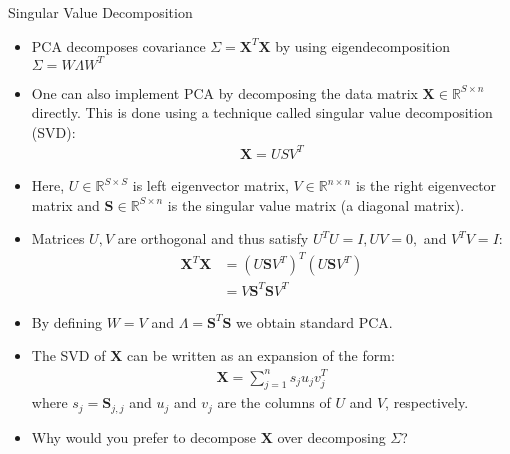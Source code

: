 \documentclass[9pt]{beamer}
\begin{document}
\begin{frame}{Singular Value Decomposition}

\begin{itemize}
\item PCA decomposes covariance $\Sigma=\mathbf{X}^T\mathbf{X}$ by using  eigendecomposition $\Sigma=W\Lambda W^T$

\item One can also implement PCA by decomposing the data matrix $\mathbf{X}\in\mathbb{R}^{S\times n}$ directly. This is done using a technique called singular value decomposition (SVD):
\begin{align*}
\mathbf{X}=USV^T
\end{align*}
\item Here, $U\in \mathbb{R}^{S\times S}$ is left eigenvector matrix, $V\in \mathbb{R}^{n\times n}$ is the right eigenvector matrix and $\mathbf{S}\in \mathbb{R}^{S\times n}$ is the singular value matrix (a diagonal matrix). 
\item Matrices $U,V$ are orthogonal and thus satisfy $U^TU=I,UV=0,$ and $V^TV=I$:
\begin{align*}
\mathbf{X}^T\mathbf{X}&=(U\mathbf{S}V^T)^T(U\mathbf{S}V^T)\\
&=V\mathbf{S}^T\mathbf{S}V^T
\end{align*}
\item By defining $W=V$ and $\Lambda=\mathbf{S}^T\mathbf{S}$ we obtain standard PCA. 
\item The SVD of $\mathbf{X}$ can be written as an expansion of the form:
\begin{align*}
\mathbf{X}=\sum_{j=1}^ns_ju_jv_j^T
\end{align*}
where $s_j=\mathbf{S}_{j,j}$ and $u_j$ and $v_j$ are the columns of $U$ and $V$, respectively. 
\item Why would you prefer to decompose $\mathbf{X}$ over decomposing $\Sigma$?
 
\end{itemize}


\end{frame}
\end{document}
